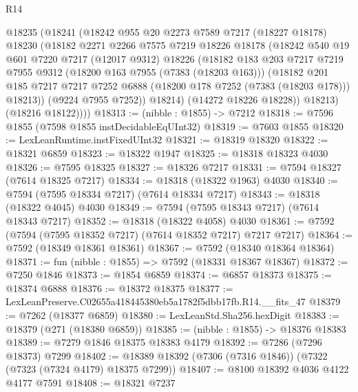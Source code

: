 \begin{lexlean}{R14}
\begin{coremodule}
        @18235
          (@18241
            (@18242
              @955
              @20
              @2273
              @7589
              @7217
              (@18227 @18178)
              @18230
              (@18182
                @2271
                @2266
                @7575
                @7219
                @18226
                @18178
                (@18242
                  @540
                  @19
                  @601
                  @7220
                  @7217
                  (@12017 @9312)
                  @18226
                  (@18182
                    @183
                    @203
                    @7217
                    @7219
                    @7955
                    @9312
                    (@18200 @163 @7955 (@7383 (@18203 @163)))
                    (@18182
                      @201
                      @185
                      @7217
                      @7217
                      @7252
                      @6888
                      (@18200 @178 @7252 (@7383 (@18203 @178)))
                      @18213))
                  (@9224 @7955 @7252))
                @18214)
              (@14272 @18226 @18228))
            @18213)
          (@18216 @18122))))
@18313 := (nibble : @1855) -> @7212
@18318 := @7596 @1855 (@7598 @1855 instDecidableEqUInt32)
@18319 := @7603 @1855
@18320 := LexLeanRuntime.instFixedUInt32
@18321 := @18319 @18320
@18322 := @18321 @6859
@18323 := @18322 @1947
@18325 := @18318 @18323 @4030
@18326 := @7595 @18325
@18327 := @18326 @7217
@18331 := @7594 @18327 (@7614 @18325 @7217)
@18334 := @18318 (@18322 @1963) @4030
@18340 := @7594 (@7595 @18334 @7217) (@7614 @18334 @7217)
@18343 := @18318 (@18322 @4045) @4030
@18349 := @7594 (@7595 @18343 @7217) (@7614 @18343 @7217)
@18352 := @18318 (@18322 @4058) @4030
@18361 := @7592 (@7594 (@7595 @18352 @7217) (@7614 @18352 @7217) @7217 @7217)
@18364 := @7592 (@18349 @18361 @18361)
@18367 := @7592 (@18340 @18364 @18364)
@18371 := fun (nibble : @1855) => @7592 (@18331 @18367 @18367)
@18372 := @7250 @1846
@18373 := @1854 @6859
@18374 := @6857 @18373
@18375 := @18374 @6888
@18376 := @18372 @18375
@18377 := LexLeanPreserve.C02655a418445380eb5a1782f5dbb17fb.R14.__fits_47
@18379 := @7262 (@18377 @6859)
@18380 := LexLeanStd.Sha256.hexDigit
@18383 := @18379 (@271 (@18380 @6859))
@18385 := (nibble : @1855) -> @18376 @18383
@18389 := @7279 @1846 @18375 @18383 @4179
@18392 := @7286 (@7296 @18373) @7299
@18402 := @18389 @18392 (@7306 (@7316 @1846)) (@7322 (@7323 (@7324 @4179) @18375 @7299))
@18407 := @8100 @18392 @4036 @4122 @4177 @7591
@18408 := @18321 @7237

\end{coremodule}
\end{lexlean}
